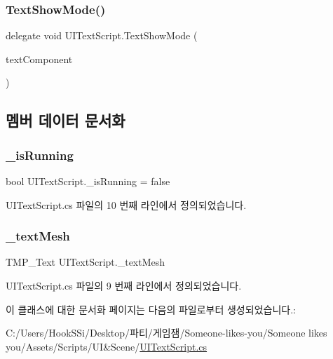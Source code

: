 \subsubsection{\texorpdfstring{TextShowMode()}{TextShowMode()}}
{\footnotesize\ttfamily delegate void U\+I\+Text\+Script.\+Text\+Show\+Mode (\begin{DoxyParamCaption}\item[{T\+M\+P\+\_\+\+Text}]{text\+Component }\end{DoxyParamCaption})}



\subsection{멤버 데이터 문서화}
\mbox{\label{class_u_i_text_script_af8a950f4500b100ffe89394102f2edbb}} 
\subsubsection{\texorpdfstring{\_isRunning}{\_isRunning}}
{\footnotesize\ttfamily bool U\+I\+Text\+Script.\+\_\+is\+Running = false}



U\+I\+Text\+Script.\+cs 파일의 10 번째 라인에서 정의되었습니다.

\mbox{\label{class_u_i_text_script_ac269c7294a861e6e87816d8257c6efc8}} 
\subsubsection{\texorpdfstring{\_textMesh}{\_textMesh}}
{\footnotesize\ttfamily T\+M\+P\+\_\+\+Text U\+I\+Text\+Script.\+\_\+text\+Mesh}



U\+I\+Text\+Script.\+cs 파일의 9 번째 라인에서 정의되었습니다.



이 클래스에 대한 문서화 페이지는 다음의 파일로부터 생성되었습니다.\+:\begin{DoxyCompactItemize}
\item 
C\+:/\+Users/\+Hook\+S\+Si/\+Desktop/파티/게임잼/\+Someone-\/likes-\/you/\+Someone likes you/\+Assets/\+Scripts/\+U\+I\&\+Scene/\mbox{\hyperlink{_u_i_text_script_8cs}{U\+I\+Text\+Script.\+cs}}\end{DoxyCompactItemize}

